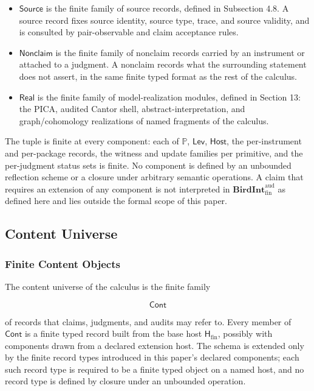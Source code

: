 \documentclass[11pt]{article}
\theoremstyle{definition}
\begin{document}
\begin{itemize}
\item
  \(\mathsf{Source}\) is the finite family of source records, defined in Subsection 4.8. A source record fixes source identity, source type, trace, and source validity, and is consulted by pair-observable and claim acceptance rules.
\item
  \(\mathsf{Nonclaim}\) is the finite family of nonclaim records carried by an instrument or attached to a judgment. A nonclaim records what the surrounding statement does not assert, in the same finite typed format as the rest of the calculus.
\item
  \(\mathsf{Real}\) is the finite family of model-realization modules, defined in Section 13: the PICA, audited Cantor shell, abstract-interpretation, and graph/cohomology realizations of named fragments of the calculus.
\end{itemize}

The tuple is finite at every component: each of \(\mathbb P\), \(\mathsf{Lev}\), \(\mathsf{Host}\), the per-instrument and per-package records, the witness and update families per primitive, and the per-judgment status sets is finite. No component is defined by an unbounded reflection scheme or a closure under arbitrary semantic operations. A claim that requires an extension of any component is not interpreted in \(\mathbf{BirdInt}^{\mathrm{aud}}_{\mathrm{fin}}\) as defined here and lies outside the formal scope of this paper.

\subsection{Content Universe}

\subsubsection{Finite Content Objects}

The content universe of the calculus is the finite family

\[
\mathsf{Cont}
\]

of records that claims, judgments, and audits may refer to. Every member of \(\mathsf{Cont}\) is a finite typed record built from the base host \(\mathsf H_{\mathrm{fin}}\), possibly with components drawn from a declared extension host. The schema is extended only by the finite record types introduced in this paper's declared components; each such record type is required to be a finite typed object on a named host, and no record type is defined by closure under an unbounded operation.
\end{document}
